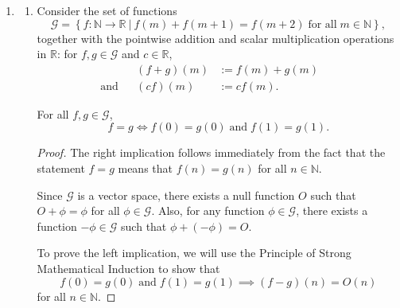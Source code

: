 \begin{enumerate}
        Therefore, we have
        \[
            \sum_{\substack{i, j = 1 \\ i < j}}^6 \vb{u_i} \times \vb{u_j} = 3 \sqrt{3} \, \vb{e_3} = [0, 0, 3 \sqrt{3}].
        \]

        \bigskip

    \item
        \begin{enumerate}

            \item Consider the set of functions
                \[
                    \mathscr{G} = \left\{f: \mathbb{N} \rightarrow \mathbb{R} \: \big| \: f(m) + f(m + 1) = f(m + 2) \; \text{for all} \; m \in \mathbb{N}\right\},
                \]
                together with the pointwise addition and scalar multiplication operations in $\mathbb{R}$: for $f, g \in \mathscr{G}$ and $c \in \mathbb{R}$,
                \begin{align}
                    && (f + g)(m) &:= f(m) + g(m) && \label{eq:7}  \\
                    \text{and} && (cf)(m) &:= cf(m). \label{eq:8}
                \end{align}

                \begin{proposition} \label{prop:10}
                    For all $f, g \in \mathscr{G}$,
                    \[
                        f = g \Longleftrightarrow f(0) = g(0) \; \text{and} \; f(1) = g(1).
                    \]
                \end{proposition}

                \begin{proof}
                    The right implication follows immediately from the fact that the statement $f = g$ means that $f(n) = g(n)$ for all $n \in \mathbb{N}$.

                    \smallskip

                    \begin{note}
                        Since $\mathscr{G}$ is a vector space, there exists a null function $O$ such that $O + \phi = \phi$ for all $\phi \in \mathscr{G}$. Also, for any function $\phi \in \mathscr{G}$, there exists a function $- \phi \in \mathscr{G}$ such that $\phi + (- \phi) = O$.
                    \end{note}

                    To prove the left implication, we will use the Principle of Strong Mathematical Induction to show that
                    \[
                        f(0) = g(0) \; \text{and} \; f(1) = g(1) \implies (f - g)(n) = O(n)
                    \]
                    for all $n \in \mathbb{N}$.


\end{proof}
\end{enumerate}
\end{enumerate}
